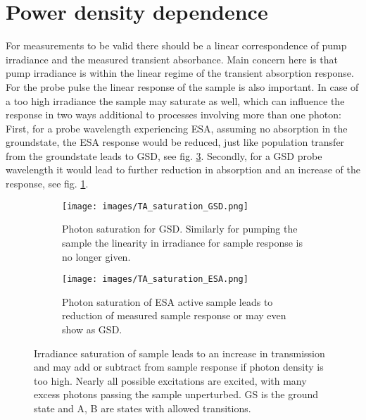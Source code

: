 \documentclass[twoside,openright,listof=numbered]{scrreprt}
\begin{document}
\section{Power density dependence}\label{sec:powerVar}
For measurements to be valid there should be a linear correspondence of pump irradiance and the measured transient absorbance. Main concern here is that pump irradiance is within the linear regime of the transient absorption response. For the probe pulse the linear response of the sample is also important. In case of a too high irradiance the sample may saturate as well, which can influence the response in two ways additional to processes involving more than one photon: First, for a probe wavelength experiencing ESA, assuming no absorption in the groundstate, the ESA response would be reduced, just like population transfer from the groundstate leads to GSD, see fig. \ref{fig:photonSatESA}. Secondly, for a GSD probe wavelength it would lead to further reduction in absorption and an increase of the response, see fig. \ref{fig:photonSatGSD}.\\

\begin{figure}[h]
\centering
\begin{subfigure}[b]{0.5\linewidth}
\centering
\texttt{[image: images/TA\_saturation\_GSD.png]}
\caption{Photon saturation for GSD. Similarly for pumping the sample the linearity in irradiance for sample response is no longer given.\label{fig:photonSatGSD}}
\end{subfigure}\hfill
\begin{subfigure}[b]{0.5\linewidth}
\centering
\texttt{[image: images/TA\_saturation\_ESA.png]}
\caption{Photon saturation of ESA active sample leads to reduction of measured sample response or may even show as GSD.\label{fig:photonSatESA}}
\end{subfigure}
\caption[Visualisation of photon saturation behaviour for GSD and ESA.]{Irradiance saturation of sample leads to an increase in transmission and may add or subtract from sample response if photon density is too high. Nearly all possible excitations are excited, with many excess photons passing the sample unperturbed.  GS is the ground state and A, B are states with allowed transitions.}
\end{figure}
\end{document}
